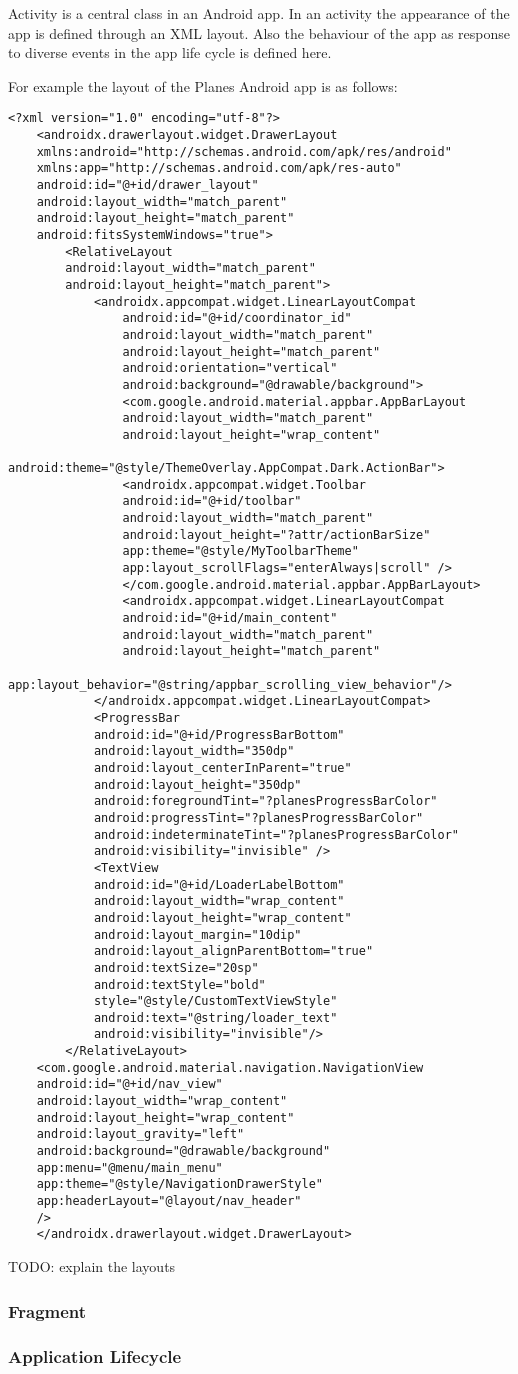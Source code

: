 Activity is a central class in an Android app. In an activity the appearance of the app is defined through an XML layout. Also the behaviour of the app as response to diverse events in the app life cycle is defined here.

For example the layout of the Planes Android app is as follows:

\begin{lstlisting}
<?xml version="1.0" encoding="utf-8"?>
	<androidx.drawerlayout.widget.DrawerLayout
	xmlns:android="http://schemas.android.com/apk/res/android"
	xmlns:app="http://schemas.android.com/apk/res-auto"
	android:id="@+id/drawer_layout"
	android:layout_width="match_parent"
	android:layout_height="match_parent"
	android:fitsSystemWindows="true">
		<RelativeLayout
		android:layout_width="match_parent"
		android:layout_height="match_parent">
			<androidx.appcompat.widget.LinearLayoutCompat
				android:id="@+id/coordinator_id"
				android:layout_width="match_parent"
				android:layout_height="match_parent"
				android:orientation="vertical"
				android:background="@drawable/background">
				<com.google.android.material.appbar.AppBarLayout
				android:layout_width="match_parent"
				android:layout_height="wrap_content"
				android:theme="@style/ThemeOverlay.AppCompat.Dark.ActionBar">
				<androidx.appcompat.widget.Toolbar
				android:id="@+id/toolbar"
				android:layout_width="match_parent"
				android:layout_height="?attr/actionBarSize"
				app:theme="@style/MyToolbarTheme"
				app:layout_scrollFlags="enterAlways|scroll" />
				</com.google.android.material.appbar.AppBarLayout>
				<androidx.appcompat.widget.LinearLayoutCompat
				android:id="@+id/main_content"
				android:layout_width="match_parent"
				android:layout_height="match_parent"
				app:layout_behavior="@string/appbar_scrolling_view_behavior"/>
			</androidx.appcompat.widget.LinearLayoutCompat>
			<ProgressBar
			android:id="@+id/ProgressBarBottom"
			android:layout_width="350dp"
			android:layout_centerInParent="true"
			android:layout_height="350dp"
			android:foregroundTint="?planesProgressBarColor"
			android:progressTint="?planesProgressBarColor"
			android:indeterminateTint="?planesProgressBarColor"
			android:visibility="invisible" />
			<TextView
			android:id="@+id/LoaderLabelBottom"
			android:layout_width="wrap_content"
			android:layout_height="wrap_content"
			android:layout_margin="10dip"
			android:layout_alignParentBottom="true"
			android:textSize="20sp"
			android:textStyle="bold"
			style="@style/CustomTextViewStyle"
			android:text="@string/loader_text"
			android:visibility="invisible"/>
		</RelativeLayout>
	<com.google.android.material.navigation.NavigationView
	android:id="@+id/nav_view"
	android:layout_width="wrap_content"
	android:layout_height="wrap_content"
	android:layout_gravity="left"
	android:background="@drawable/background"
	app:menu="@menu/main_menu"
	app:theme="@style/NavigationDrawerStyle"
	app:headerLayout="@layout/nav_header"
	/>
	</androidx.drawerlayout.widget.DrawerLayout>
\end{lstlisting}
 
 TODO: explain the layouts

\subsubsection { Fragment }

\subsubsection { Application Lifecycle }
